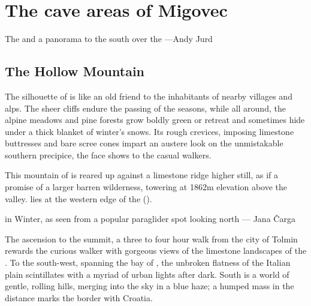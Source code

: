 \chapter{The cave areas of Migovec}
\begin{marginfigure}
\checkoddpage \ifoddpage \forcerectofloat \else \forceversofloat \fi
\centering
 \caption{The \protect{} and a panorama to the south over the \protect{} ---Andy Jurd}
 \label{dinarides}
\end{marginfigure}

\section{The Hollow Mountain}
The silhouette of  is like an old friend to the inhabitants of nearby villages and alps. The sheer cliffs endure the passing of the seasons, while all around, the alpine meadows and pine forests grow boldly green or retreat and sometimes hide under a thick blanket of winter's snows. Its rough crevices, imposing limestone buttresses and bare scree cones impart an austere look on the unmistakable southern precipice, the face  shows to the casual walkers.

This mountain of  is reared up against a limestone ridge higher still, as if a promise of a larger barren wilderness, towering at 1862m elevation above the valley.  lies at the western edge of the  (). 


 \begin{pagefigure}
 \checkoddpage \ifoddpage \forcerectofloat \else \forceversofloat \fi
\centering
  \label{winter panorama migovec}
  \caption{\protect{} in Winter, as seen from a popular paraglider spot looking north --- Jana Čarga}
 \end{pagefigure}

The ascension to the summit, a three to four hour walk from the city of Tolmin rewards the curious walker with gorgeous views of the limestone landscapes of the . To the south-west, spanning the bay of , the unbroken flatness of the Italian plain scintillates with a myriad of urban lights after dark. South is a world of gentle, rolling hills, merging into the sky in a blue haze; a humped mass in the distance marks the border with Croatia. 


